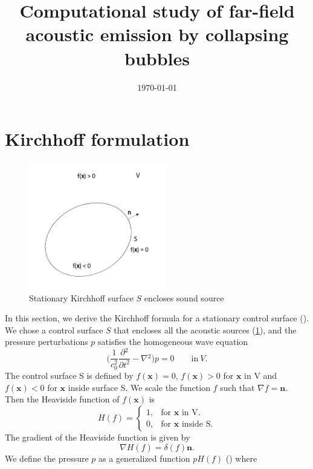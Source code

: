 \documentclass[a4paper]{article}
\title{Computational study of far-field acoustic emission by collapsing bubbles}
\author{}
\date{\today}
\begin{document}
\maketitle
\section{Kirchhoff formulation}
\begin{figure}[h!]\label{Kirchhoff}
	\centering
	\includegraphics[width=60mm]{images/kirchhoff_surface.png}
	\caption{Stationary Kirchhoff surface $S$ encloses sound source}
\end{figure}
In this section, we derive the Kirchhoff formula for a stationary control surface (\cite{FARASSAT1988451}). We chose a control surface $S$ that encloses all the acoustic sources (\ref{Kirchhoff}), and the pressure perturbations $p$ satisfies the homogeneous wave equation
\begin{equation}\label{Wave equation}
	\Bigg( \frac{1}{c_{0}^2}\frac{\partial{}^{2}}{\partial{t}^{2}}- \nabla{}^{2} \Bigg) p = 0 \quad \quad \textrm{in} \ V.
\end{equation}
The control surface S is defined by $f(\mathbf{x}) = 0$, $f(\mathbf{x}) > 0$ for $\mathbf{x}$ in V and $f(\mathbf{x}) < 0$ for $\mathbf{x}$ inside surface S. We scale the function $f$ such that $\nabla f = \mathbf{n}$. Then the Heaviside function of $f(\mathbf{x})$    is
\begin{equation}\label{Heaviside}
	H(f) =\begin{cases}
		1, & \text{for $\mathbf{x}$ in V}.     \\
		0, & \text{for $\mathbf{x}$ inside S}.
	\end{cases}
\end{equation}
The gradient of the Heaviside function is given by
\begin{equation}\label{Gradient Heaviside}
	\nabla H(f) = \delta (f) \mathbf{n}.
\end{equation}
We define the pressure $p$ as a generalized function $pH(f)$ (\cite{ffowcs1969sound}) where
\end{document}
